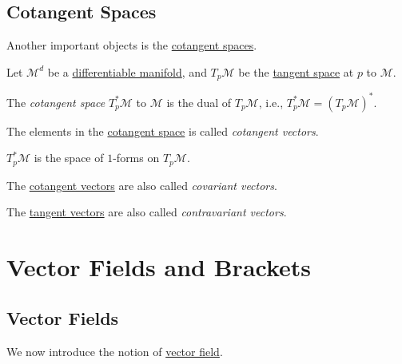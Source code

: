 \subsection{Cotangent Spaces}
Another important objects is the \hyperref[def:cotangent-space]{cotangent spaces}.

\begin{definition*}
	Let \(\mathcal{M} ^d\) be a \hyperref[def:smooth-manifold]{differentiable manifold}, and \(T_p \mathcal{M} \) be the \hyperref[def:tangent-space]{tangent space} at \(p\) to \(\mathcal{M} \).
	\begin{definition}\label{def:cotangent-space}
		The \emph{cotangent space} \(T^{\ast} _p \mathcal{M} \) to \(\mathcal{M} \) is the dual of \(T_p \mathcal{M} \), i.e., \(T^{\ast} _p\mathcal{M} = (T_p \mathcal{M} )^{\ast} \).
	\end{definition}
	\begin{definition}\label{def:cotangent-vector}
		The elements in the \hyperref[def:cotangent-space]{cotangent space} is called \emph{cotangent vectors}.
	\end{definition}
\end{definition*}

\begin{remark}
	\(T^{\ast} _p \mathcal{M} \) is the space of \(1\)-forms on \(T_p \mathcal{M} \).
\end{remark}

\begin{notation}\label{not:covariant-vector}
	The \hyperref[def:cotangent-vector]{cotangent vectors} are also called \emph{covariant vectors}.
\end{notation}

\begin{notation}\label{not:contravariant-vector}
	The \hyperref[def:tangent-vector]{tangent vectors} are also called \emph{contravariant vectors}.
\end{notation}

\section{Vector Fields and Brackets}
\subsection{Vector Fields}
We now introduce the notion of \hyperref[def:vector-field]{vector field}.

